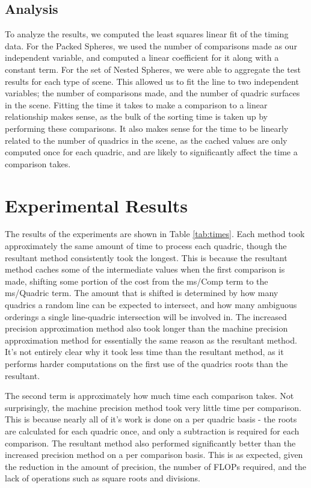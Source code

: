 \documentclass{cccg16}
\begin{document}
\subsection{Analysis}
To analyze the results, we computed the least squares linear fit of
the timing data.  For the Packed Spheres, we used the number of
comparisons made as our independent variable, and computed a linear
coefficient for it along with a constant term.  For the set of Nested
Spheres, we were able to aggregate the test results for each type
of scene.  This allowed us to fit the line to two independent
variables; the number of comparisons made, and the number of quadric
surfaces in the scene.  Fitting the time it takes to make a comparison
to a linear relationship makes sense, as the bulk of the sorting time
is taken up by performing these comparisons.  It also makes sense for
the time to be linearly related to the number of quadrics in the
scene, as the cached values are only computed once for each quadric,
and are likely to significantly affect the time a comparison takes.

\section{Experimental Results}
The results of the experiments are shown in Table \ref{tab:times}.
Each method took approximately the same amount of time to process each
quadric, though the resultant method consistently took the longest.
This is because the resultant method caches some of the intermediate
values when the first comparison is made, shifting some portion of the
cost from the ms/Comp term to the ms/Quadric term.  The
amount that is shifted is determined by how many quadrics a random
line can be expected to intersect, and how many ambiguous orderings a
single line-quadric intersection will be involved in.  The increased
precision approximation method also took longer than the machine
precision approximation method for essentially the same reason as the
resultant method.  It's not entirely clear why it took less time than
the resultant method, as it performs harder computations on the first
use of the quadrics roots than the resultant.

The second term is approximately how much time each comparison takes.
Not surprisingly, the machine precision method took very little time
per comparison.  This is because nearly all of it's work is done on a
per quadric basis - the roots are calculated for each quadric once,
and only a subtraction is required for each comparison. The resultant
method also performed significantly better than the increased
precision method on a per comparison basis.  This is as expected,
given the reduction in the amount of precision, the number of FLOPs
required, and the lack of operations such as square roots and
divisions.
\end{document}
